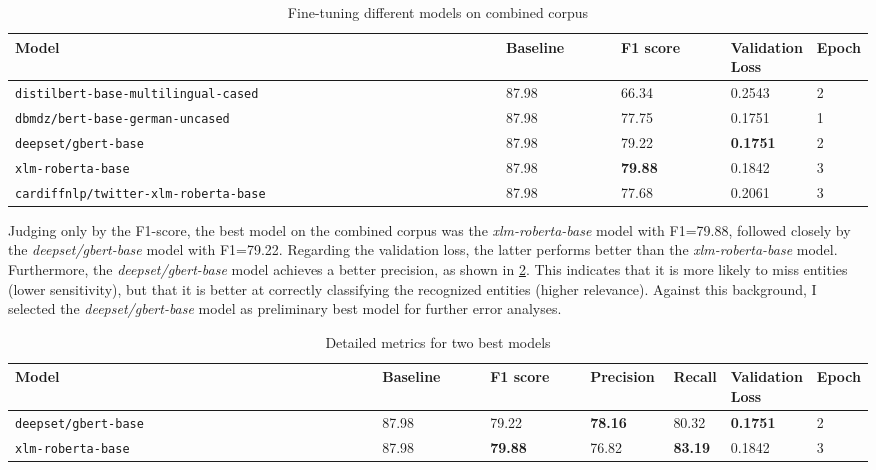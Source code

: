 \begin{table}[htp]
\caption{Fine-tuning different models on combined corpus}
\label{tab:experiments_sm_tg}
\centering
\begin{adjustbox}{max width=\textwidth}
\begin{tabular}{|p{0.7\linewidth}|p{0.15\linewidth}|p{0.15\linewidth}|p{0.15\linewidth}|p{0.15\linewidth}|}
\hline
\textbf{Model} & \textbf{Baseline} & \textbf{F1 score} & \textbf{Validation Loss}& \textbf{Epoch}\\ \hline 
\verb|distilbert-base-multilingual-cased| & 87.98 & 66.34 & 0.2543 & 2 \\ \hline
\verb|dbmdz/bert-base-german-uncased| & 87.98 & 77.75 & 0.1751 & 1 \\ \hline
\verb|deepset/gbert-base|& 87.98 & 79.22 & \textbf{0.1751} & 2 \\ \hline
\verb|xlm-roberta-base|& 87.98 & \textbf{79.88} & 0.1842 & 3 \\ \hline
\verb|cardiffnlp/twitter-xlm-roberta-base|& 87.98 & 77.68 & 0.2061 & 3 \\ \hline
\end{tabular}
\end{adjustbox}
\end{table}

Judging only by the F1-score, the best model on the combined corpus was the \textit{xlm-roberta-base} model with F1=79.88, followed closely by the \textit{deepset/gbert-base} model with F1=79.22. Regarding the validation loss, the latter performs better than the \textit{xlm-roberta-base} model. Furthermore, the \textit{deepset/gbert-base} model achieves a better precision, as shown in \ref{tab:best_models_metrics}. This indicates that it is more likely to miss entities (lower sensitivity), but that it is better at correctly classifying the recognized entities (higher relevance). Against this background, I selected the \textit{deepset/gbert-base} model as preliminary best model for further error analyses.

\begin{table}[htp]
\caption{Detailed metrics for two best models}
\label{tab:best_models_metrics}
\centering
\begin{adjustbox}{max width=\textwidth}
\begin{tabular}{|p{0.6\linewidth}|p{0.15\linewidth}|p{0.15\linewidth}|p{0.15\linewidth}|p{0.15\linewidth}|p{0.15\linewidth}|p{0.15\linewidth}|}
\hline
\textbf{Model} & \textbf{Baseline} & \textbf{F1 score} & \textbf{Precision}& \textbf{Recall} & \textbf{Validation Loss} & \textbf{Epoch}\\ \hline 

\verb|deepset/gbert-base|& 87.98 & 79.22 & \textbf{78.16} & 80.32 & 
\textbf{0.1751} & 2 \\ \hline
\verb|xlm-roberta-base| & 87.98& \textbf{79.88} & 76.82 & \textbf{83.19} & 0.1842 & 3 \\ \hline
\end{tabular}
\end{adjustbox}
\end{table}


